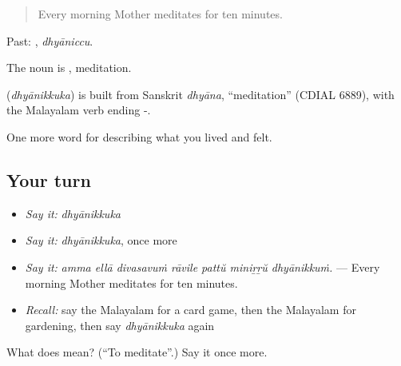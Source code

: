 \begin{quote}
Every morning Mother meditates for ten minutes.
\end{quote}

Past: , \emph{dhyāniccu}.

The noun is , meditation.

\begin{cousinweb}
\textbf{} (\emph{dhyānikkuka}) is built from Sanskrit \emph{dhyāna}, \textquotedblleft{}meditation\textquotedblright{} (CDIAL 6889), with the Malayalam verb ending -.
\end{cousinweb}

\begin{grammarlens}[title={What you've built}]
One more word for describing what you lived and felt.
\end{grammarlens}

\subsection*{Your turn}
\begin{itemize}
\raggedright
  \item \emph{Say it:} \emph{dhyānikkuka}
  \item \emph{Say it:} \emph{dhyānikkuka}, once more
  \item \emph{Say it:} \emph{amma ellā divasavuṁ rāvile pattŭ miniṟṟŭ dhyānikkuṁ.} — Every morning Mother meditates for ten minutes.
  \item \emph{Recall:} say the Malayalam for a card game, then the Malayalam for gardening, then say \emph{dhyānikkuka} again
\end{itemize}

\begin{tcolorbox}[breakable,colback=teal!4,colframe=teal!35!black,title={Before you move on}]
What does  mean? (\textquotedblleft{}To meditate\textquotedblright{}.) Say it once more.
\end{tcolorbox}
